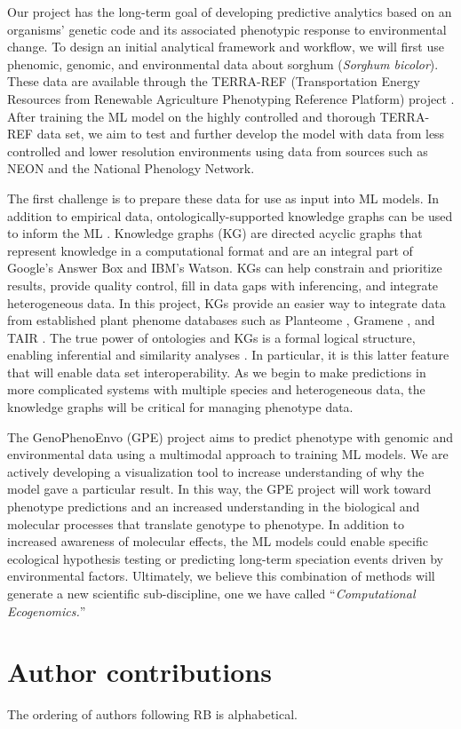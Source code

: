 \documentclass[12pt,]{article}
\begin{document}
Our project has the long-term goal of developing predictive analytics
based on an organisms' genetic code and its associated phenotypic
response to environmental change. To design an initial analytical
framework and workflow, we will first use phenomic, genomic, and
environmental data about sorghum (\emph{Sorghum bicolor}). These data
are available through the TERRA-REF (Transportation Energy Resources
from Renewable Agriculture Phenotyping Reference Platform) project
\citep{lebauer2020data, burnette2018terra}. After training the ML model
on the highly controlled and thorough TERRA-REF data set, we aim to test
and further develop the model with data from less controlled and lower
resolution environments using data from sources such as NEON and the
National Phenology Network.

The first challenge is to prepare these data for use as input into ML
models. In addition to empirical data, ontologically-supported knowledge
graphs can be used to inform the ML \citep{mungall2017monarch}.
Knowledge graphs (KG) are directed acyclic graphs that represent
knowledge in a computational format and are an integral part of Google's
Answer Box and IBM's Watson. KGs can help constrain and prioritize
results, provide quality control, fill in data gaps with inferencing,
and integrate heterogeneous data. In this project, KGs provide an easier
way to integrate data from established plant phenome databases such as
Planteome \citep{cooper2018planteome}, Gramene
\citep{jaiswal_gramene_2011}, and TAIR \citep{poole_tair_2007}. The true
power of ontologies and KGs is a formal logical structure, enabling
inferential and similarity analyses
\citep{mungall2017monarch, washington2009linking}. In particular, it is
this latter feature that will enable data set interoperability. As we
begin to make predictions in more complicated systems with multiple
species and heterogeneous data, the knowledge graphs will be critical
for managing phenotype data.

The GenoPhenoEnvo (GPE) project aims to predict phenotype with genomic
and environmental data using a multimodal approach to training ML
models. We are actively developing a visualization tool to increase
understanding of why the model gave a particular result. In this way,
the GPE project will work toward phenotype predictions and an increased
understanding in the biological and molecular processes that translate
genotype to phenotype. In addition to increased awareness of molecular
effects, the ML models could enable specific ecological hypothesis
testing or predicting long-term speciation events driven by
environmental factors. Ultimately, we believe this combination of
methods will generate a new scientific sub-discipline, one we have
called ``\emph{Computational Ecogenomics.}''

\hypertarget{author-contributions}{%
\section{Author contributions}\label{author-contributions}}

The ordering of authors following RB is alphabetical.

\renewcommand\refname{References}

\end{document}

